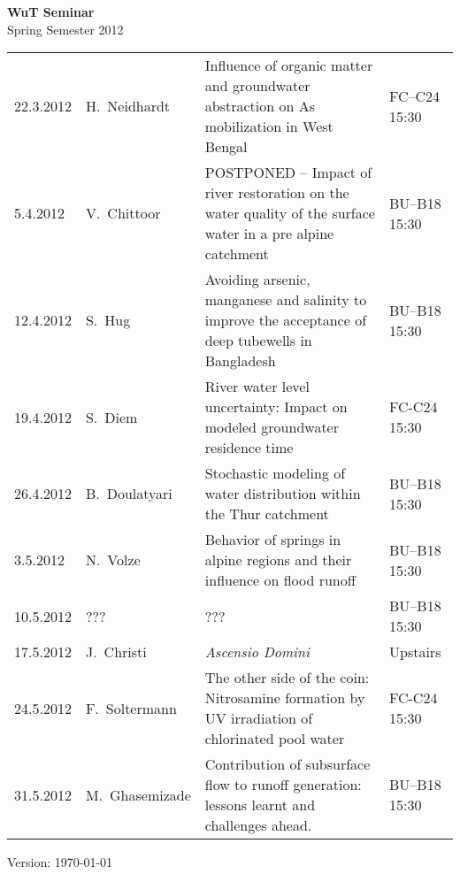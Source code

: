 \documentclass[12pt]{article}
\begin{document}
\centering

{\Huge \bf WuT Seminar}\\[1cm]
{\Large Spring Semester 2012}\\[1.8cm]

\large
\renewcommand*\arraystretch{1.4}
\begin{tabular}{l p{3.8cm} p{9.5cm} p{2cm}}

22.3.2012
	& H.~Neidhardt
	& Influence of organic matter and groundwater abstraction on As mobilization in West Bengal
	& FC--C24 15:30\\

5.4.2012
	& V.~Chittoor
	& POSTPONED -- Impact of river restoration on the water quality of the surface water in a pre alpine catchment
	& BU--B18 15:30\\

12.4.2012
	& S.~Hug
	& Avoiding arsenic, manganese and salinity to improve the acceptance of deep tubewells in Bangladesh
	& BU--B18 15:30\\

19.4.2012
	& S.~Diem
	& River water level uncertainty: Impact on modeled groundwater residence time
	& FC-C24 15:30\\

26.4.2012
	& B.~Doulatyari
	& Stochastic modeling of water distribution within the Thur catchment
	& BU--B18 15:30\\

3.5.2012
	& N.~Volze
	& Behavior of springs in alpine regions and their influence on flood runoff
	& BU--B18 15:30\\

10.5.2012
	& ???
	& ???
	& BU--B18 15:30\\

17.5.2012
	& J.~Christi
	& \it{Ascensio Domini}
	& Upstairs\\

24.5.2012
	& F.~Soltermann
	& The other side of the coin: Nitrosamine formation by UV irradiation of chlorinated pool water
	& FC-C24 15:30\\

31.5.2012
	& M.~Ghasemizade
	& Contribution of subsurface flow to runoff generation: lessons learnt and challenges ahead.
	& BU--B18 15:30\\




\end{tabular}

\vfill

{\scriptsize Version: \today}

\end{document}
